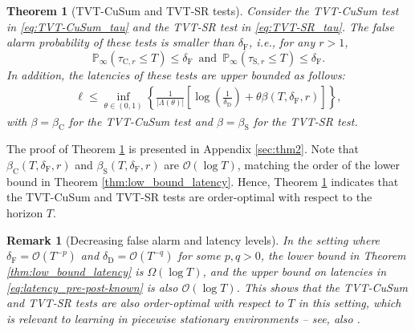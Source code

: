 \documentclass[12pt]{interact}
\newcommand{\lp}{\left(}
\newcommand{\rp}{\right)}
\newcommand{\lb}{\left[}
\newcommand{\rb}{\right]}
\newcommand{\lbp}{\left\{}
\newcommand{\rbp}{\right\}}
\newcommand{\mcal}{\mathcal}
\newcommand{\mrm}{\mathrm}
\renewcommand{\Pr}{\mathbb{P}}
\theoremstyle{plain}
\newtheorem{theorem}{Theorem}
\newtheorem{remark}{Remark}
\begin{document}
%
\begin{theorem} [TVT-CuSum and TVT-SR tests] \label{thm:latency_pre-post-known}
Consider the TVT-CuSum test in \eqref{eq:TVT-CuSum_tau} and the TVT-SR test in \eqref{eq:TVT-SR_tau}. The false alarm probability of these tests is smaller than $\delta_{\mrm{F}}$, i.e., for any $r>1$,
%
\begin{equation}\label{FA_pre-post-known}
    \Pr_{\infty} \lp \tau_{\mrm{C},r} \leq T \rp \leq \delta_{\mrm{F}} \enspace\mrm{and}\enspace \Pr_{\infty} \lp \tau_{\mrm{S},r} \leq T \rp \leq \delta_{\mrm{F}}.
\end{equation}
%
In addition, the latencies of these tests are upper bounded as follows:
%
\begin{align}\label{eq:latency_pre-post-known}
    \ell \leq \inf_{\theta\in\lp0,1\rp} \lbp \frac{1}{\lvert\Lambda\lp\theta\rp\rvert} \lb\log\lp\frac{1}{\delta_{\mathrm{D}}}\rp +\theta\beta\lp T, \delta_{\mrm{F}}, r\rp\rb\rbp,
\end{align}
%
with $\beta = \beta_{\mrm{C}}$ for the TVT-CuSum test and $\beta = \beta_{\mrm{S}}$ for the TVT-SR test.
\end{theorem}

The proof of Theorem \ref{thm:latency_pre-post-known} is presented in Appendix \ref{sec:thm2}. Note that $\beta_{\mrm{C}} \lp T, \delta_{\mrm{F}}, r\rp$ and $\beta_{\mrm{S}} \lp T, \delta_{\mrm{F}}, r\rp$ are $\mcal{O} \lp \log T \rp$, matching the order of the lower bound in Theorem \ref{thm:low_bound_latency}. Hence, Theorem \ref{thm:latency_pre-post-known} indicates that the TVT-CuSum and TVT-SR tests are order-optimal with respect to the horizon $T$. 
%
\begin{remark}[Decreasing false alarm and latency levels] In the setting where $\delta_{\mrm{F}} = \mcal{O} \lp T^{-p} \rp$ and $\delta_{\mrm{D}} = \mcal{O} \lp T^{-q} \rp$ for some $p,q>0$, the lower bound in Theorem \ref{thm:low_bound_latency} is $\Omega \lp \log T \rp$, and the upper bound on latencies in \eqref{eq:latency_pre-post-known} is also $\mcal{O} \lp \log T \rp$. This shows that the TVT-CuSum and TVT-SR tests are also order-optimal with respect to $T$ in this setting, which is relevant to learning in piecewise stationary environments -- see, also \citep{huang2025sequentialchangedetectionlearning}.
\end{remark}

\end{document}
